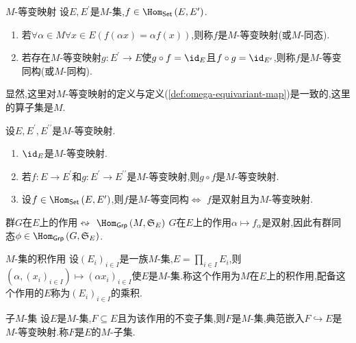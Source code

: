 \begin{definition}{$M$-等变映射}{}
	设$E,E^{\prime}$是$M$-集,$f\in\Hom_{\mathsf{Set}}\left(E,E^{\prime}\right)$.
	\begin{enumerate}
		\item 若$\forall\alpha\in M\forall x\in E\left(f\left(\alpha x\right)=\alpha f\left(x\right)\right)$,则称$f$是$M$-等变映射(或$M$-同态).
		\item 若存在$M$-等变映射$g:E^{\prime}\to E$使$g\circ f=\id_{E}$且$f\circ g=\id_{E^{\prime}}$,则称$f$是$M$-等变同构(或$M$-同构).
	\end{enumerate}
\end{definition}

显然,这里对$M$-等变映射的定义与定义(\cref{def:omega-equivariant-map})是一致的,这里的算子集是$M$.

\begin{proposition}{}{}
	设$E,E^{\prime},E^{\prime\prime}$是$M$-等变映射.
	\begin{enumerate}
		\item $\id_{E}$是$M$-等变映射.
		\item 若$f:E\to E^{\prime}$和$g:E^{\prime}\to E^{\prime\prime}$是$M$-等变映射,则$g\circ f$是$M$-等变映射.
		\item 设$f\in\Hom_{\mathsf{Set}}\left(E,E^{\prime}\right)$,则$f$是$M$-等变同构$\iff$ $f$是双射且为$M$-等变映射.
	\end{enumerate}
\end{proposition}

\begin{proposition}{群$G$在$E$上的作用$\leftrightsquigarrow$ $\Hom_{\mathsf{Grp}}\left(M,\mathfrak{S}_{E}\right)$}{}
	$G$在$E$上的作用$\alpha\mapsto f_{\alpha}$是双射,因此有群同态$\phi\in\Hom_{\mathsf{Grp}}\left(G,\mathfrak{S}_{E}\right)$.
\end{proposition}

\begin{proposition}{$M$-集的积作用}{}
	设$\left(E_{i}\right)_{i\in I}$是一族$M$-集,$E=\prod\limits_{i\in I}E_{i}$,则$\left(\alpha,\left(x_{i}\right)_{i\in I}\right)\mapsto\left(\alpha x_{i}\right)_{i\in I}$使$E$是$M$-集.称这个作用为$M$在$E$上的积作用,配备这个作用的$E$称为$\left(E_{i}\right)_{i\in I}$的乘积.
\end{proposition}

\begin{proposition}{子$M$-集}{}
	设$E$是$M$-集,$F\subseteq E$且为该作用的不变子集,则$F$是$M$-集,典范嵌入$F\hookrightarrow E$是$M$-等变映射.称$F$是$E$的$M$-子集.
\end{proposition}

